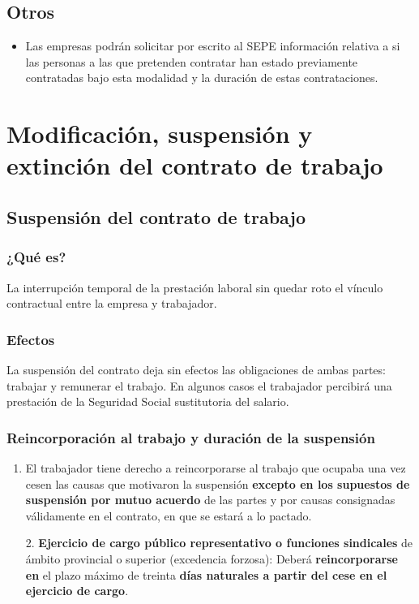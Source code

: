 \documentclass{article}
\begin{document}
	\subsection*{Otros}
	
	\begin{itemize}
		\item Las empresas podrán solicitar por escrito al SEPE información relativa a si las personas a las que pretenden contratar han estado previamente contratadas bajo esta modalidad y la duración de estas contrataciones.
	\end{itemize}
	
	\section*{Modificación, suspensión y extinción del contrato de trabajo}
	
	\subsection*{Suspensión del contrato de trabajo}
	
	\subsubsection*{¿Qué es?}
	
	La interrupción temporal de la prestación laboral sin quedar roto el vínculo contractual entre la empresa y trabajador.
	
	\subsubsection*{Efectos}
	
	La suspensión del contrato deja sin efectos las obligaciones de ambas partes: trabajar y remunerar el trabajo. En algunos casos el trabajador percibirá una prestación de la Seguridad Social sustitutoria del salario.
	
	\subsubsection*{Reincorporación al trabajo y duración de la suspensión}
	
	\begin{enumerate}
		\item El trabajador tiene derecho a reincorporarse al trabajo que ocupaba una vez cesen las causas que motivaron la suspensión \textbf{excepto en los supuestos de suspensión por mutuo acuerdo} de las partes y por causas consignadas válidamente en el contrato, en que se estará a lo pactado.
		
		2. \textbf{Ejercicio de cargo público representativo o funciones sindicales} de ámbito provincial o superior (excedencia forzosa): Deberá \textbf{reincorporarse en} el plazo máximo de treinta \textbf{días naturales a partir del cese en el ejercicio de cargo}.
	\end{enumerate}
	
\end{document}
